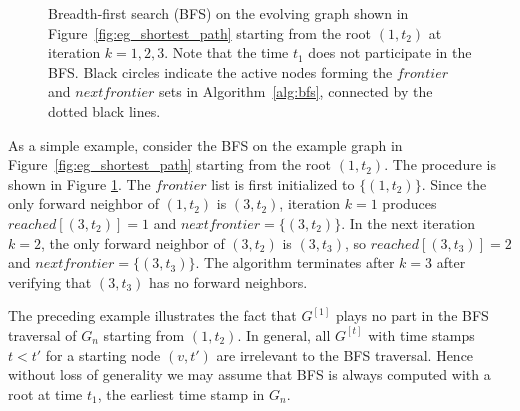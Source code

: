 \documentclass[10pt,conference,compsocconf]{IEEEtran}
\theoremstyle{definition}
\begin{document}
\begin{center}
\begin{figure}[h]
\begin{tcolorbox}
\end{tcolorbox}
\caption{Breadth-first search (BFS) on the evolving graph shown in
Figure~\ref{fig:eg_shortest_path} starting from the root $(1, t_2)$ at iteration
$k = 1, 2, 3$.
Note that the time $t_1$ does not participate in the BFS. Black circles indicate
the active nodes forming the $frontier$ and $nextfrontier$ sets in Algorithm~\ref{alg:bfs},
connected by the dotted black lines.}
\label{fig:example}
\end{figure}
\end{center}
As a simple example, consider the BFS on the example graph in
Figure~\ref{fig:eg_shortest_path} starting from the root $(1, t_2)$.
The procedure is shown in Figure \ref{fig:example}.
The $frontier$ list is first initialized to $\{(1,t_2)\}$.
Since the only forward neighbor of $(1,t_2)$ is $(3,t_2)$,
iteration $k=1$ produces $reached[(3,t_2)]=1$ and $nextfrontier = \{(3,t_2)\}$.
In the next iteration $k=2$, the only forward neighbor of $(3,t_2)$ is $(3,t_3)$,
so $reached[(3,t_3)]=2$ and $nextfrontier = \{(3,t_3)\}$.
The algorithm terminates after $k=3$ after verifying that $(3,t_3)$ has no
forward neighbors.

The preceding example illustrates the fact that $G^{[1]}$ plays no part in the
BFS traversal of $G_n$ starting from $(1, t_2)$. In general, all $G^{[t]}$ with
time stamps $t < t'$ for a starting node $(v, t')$ are irrelevant to the BFS
traversal. Hence without loss of generality we may assume that BFS is always
computed with a root at time $t_1$, the earliest time stamp in $G_n$.
\end{document}
